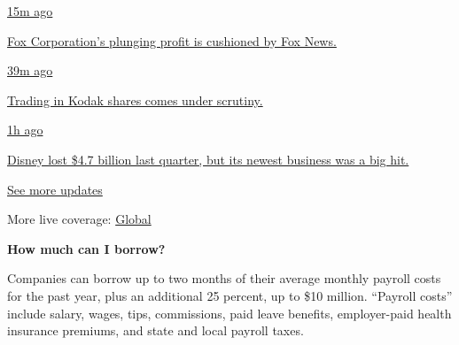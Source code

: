 \href{https://www.nytimes3xbfgragh.onion/live/2020/08/04/business/stock-market-today-coronavirus?action=click\&pgtype=Article\&state=default\&region=MAIN_CONTENT_1\&context=storylines_live_updates\#fox-corporations-plunging-profit-is-cushioned-by-fox-news}{15m
ago}

\href{https://www.nytimes3xbfgragh.onion/live/2020/08/04/business/stock-market-today-coronavirus?action=click\&pgtype=Article\&state=default\&region=MAIN_CONTENT_1\&context=storylines_live_updates\#fox-corporations-plunging-profit-is-cushioned-by-fox-news}{Fox
Corporation's plunging profit is cushioned by Fox News.}

\href{https://www.nytimes3xbfgragh.onion/live/2020/08/04/business/stock-market-today-coronavirus?action=click\&pgtype=Article\&state=default\&region=MAIN_CONTENT_1\&context=storylines_live_updates\#trading-in-kodak-shares-comes-under-scrutiny}{39m
ago}

\href{https://www.nytimes3xbfgragh.onion/live/2020/08/04/business/stock-market-today-coronavirus?action=click\&pgtype=Article\&state=default\&region=MAIN_CONTENT_1\&context=storylines_live_updates\#trading-in-kodak-shares-comes-under-scrutiny}{Trading
in Kodak shares comes under scrutiny.}

\href{https://www.nytimes3xbfgragh.onion/live/2020/08/04/business/stock-market-today-coronavirus?action=click\&pgtype=Article\&state=default\&region=MAIN_CONTENT_1\&context=storylines_live_updates\#disney-lost-4-7-billion-last-quarter-but-its-newest-business-was-a-big-hit}{1h
ago}

\href{https://www.nytimes3xbfgragh.onion/live/2020/08/04/business/stock-market-today-coronavirus?action=click\&pgtype=Article\&state=default\&region=MAIN_CONTENT_1\&context=storylines_live_updates\#disney-lost-4-7-billion-last-quarter-but-its-newest-business-was-a-big-hit}{Disney
lost \$4.7 billion last quarter, but its newest business was a big hit.}

\href{https://www.nytimes3xbfgragh.onion/live/2020/08/04/business/stock-market-today-coronavirus?action=click\&pgtype=Article\&state=default\&region=MAIN_CONTENT_1\&context=storylines_live_updates}{See
more updates}

More live coverage:
\href{https://www.nytimes3xbfgragh.onion/2020/08/04/world/coronavirus-cases.html?action=click\&pgtype=Article\&state=default\&region=MAIN_CONTENT_1\&context=storylines_live_updates}{Global}

\textbf{How much can I borrow?}

Companies can borrow up to two months of their average monthly payroll
costs for the past year, plus an additional 25 percent, up to \$10
million. ``Payroll costs'' include salary, wages, tips, commissions,
paid leave benefits, employer-paid health insurance premiums, and state
and local payroll taxes.

